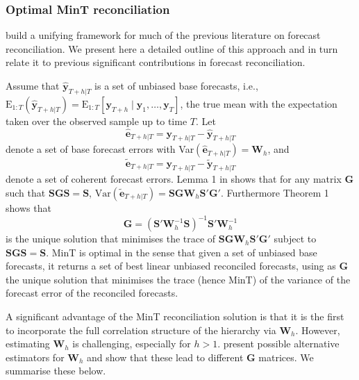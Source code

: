 \documentclass[graybox]{svmult}
\def\E{\text{E}}
\begin{document}
\subsubsection{Optimal MinT reconciliation}

\citet{WicEtAl2019} build a unifying framework for much of the previous literature on forecast reconciliation. We present here a detailed outline of this approach and in turn relate it to previous significant contributions in forecast reconciliation.

Assume that $\hat{\bm{y}}_{T+h|T}$ is a set of unbiased base forecasts, i.e., $\E_{1:T}(\hat{\bm{y}}_{T+h|T})= \E_{1:T}[\bm{y}_{T+h}\mid\bm{y}_1,\dots,\bm{y}_T]$, the true mean with the expectation taken over the observed sample up to time $T$.
Let
\begin{equation}\label{eq:base errors}
	\hat{\bm{e}}_{T+h|T} = \bm{y}_{T+h|T}-\hat{\bm{y}}_{T+h|T}
\end{equation}
denote a set of base forecast errors with Var$(\hat{\bm{e}}_{T+h|T})=\bm{W}_h$, and
\begin{equation*}
	\tilde{\bm{e}}_{T+h|T} = \bm{y}_{T+h|T}-\tilde{\bm{y}}_{T+h|T}
\end{equation*} denote a set of coherent forecast errors. Lemma 1 in \citet{WicEtAl2019} shows that for any matrix $\bm{G}$ such that $\bm{S}\bm{G}\bm{S}=\bm{S}$, $\text{Var}(\tilde{\bm{e}}_{T+h|T})=\bm{S}\bm{G}\bm{W}_h\bm{S}'\bm{G}'
$. Furthermore Theorem 1 shows that
\begin{equation} \label{eq:MinT}
	\bm{G} = (\bm{S}'{\bm{W}}^{-1}_h\bm{S})^{-1}\bm{S}'{\bm{W}}^{-1}_h
\end{equation}
is the unique solution that minimises the trace of $\bm{S}\bm{G}\bm{W}_h\bm{S}'\bm{G}'$ subject to $\bm{S}\bm{G}\bm{S}=\bm{S}$. MinT is optimal in the sense that given a set of unbiased base forecasts, it returns a set of best linear unbiased reconciled forecasts, using as $\bm{G}$ the unique solution that minimises the trace (hence MinT) of the variance of the forecast error of the reconciled forecasts.

A significant advantage of the MinT reconciliation solution is that it is the first to incorporate the full correlation structure of the hierarchy via $\bm{W}_{h}$. However, estimating $\bm{W}_{h}$ is challenging, especially for $h>1$. \citet{WicEtAl2019} present possible alternative estimators for $\bm{W}_{h}$ and show that these lead to different $\bm{G}$ matrices. We summarise these below.
\end{document}
